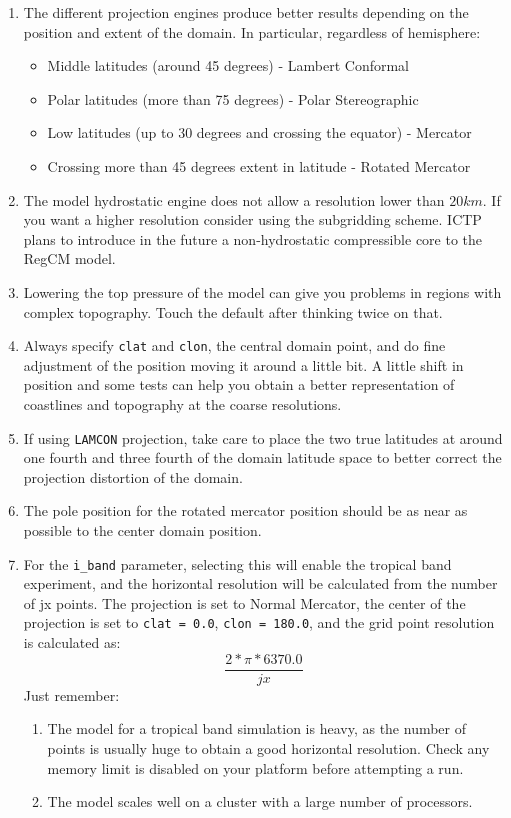 \begin{enumerate}
\item The different projection engines produce better results depending on the
position and extent of the domain. In particular, regardless of hemisphere:
\begin{itemize}
\item Middle latitudes (around 45 degrees) - Lambert Conformal
\item Polar latitudes (more than 75 degrees) - Polar Stereographic
\item Low latitudes (up to 30 degrees and crossing the equator) - Mercator
\item Crossing more than 45 degrees extent in latitude - Rotated Mercator
\end{itemize}
\item The model hydrostatic engine does not allow a resolution lower than
$20 km$. If you want a higher resolution consider using the subgridding scheme.
ICTP plans to introduce in the future a non-hydrostatic compressible core to
the RegCM model.
\item Lowering the top pressure of the model can give you problems in regions
with complex topography. Touch the default after thinking twice on that.
\item Always specify \verb=clat= and \verb=clon=, the central domain point,
and do fine adjustment of the position moving it around a little bit. A
little shift in position and some tests can help you obtain a better
representation of coastlines and topography at the coarse resolutions.
\item If using \verb=LAMCON= projection, take care to place the two
true latitudes at around one fourth and three fourth of the domain latitude
space to better correct the projection distortion of the domain.
\item The pole position for the rotated mercator position should be as near as
possible to the center domain position.
\item For the \verb=i_band= parameter, selecting this will enable the tropical
band experiment, and the horizontal resolution will be calculated from the
number of jx points.
The projection is set to Normal Mercator, the center of the projection is set
to \verb'clat = 0.0', \verb'clon = 180.0',
and the grid point resolution is calculated as:
\begin{equation}
\frac{2*\pi*6370.0}{jx}
\end{equation}
Just remember:
\begin{enumerate}
\item The model for a tropical band simulation is heavy, as the number of points
is usually huge to obtain a good horizontal resolution. Check any memory
limit is disabled on your platform before attempting a run.
\item The model scales well on a cluster with a large number of processors.
\end{enumerate}

\end{enumerate}

